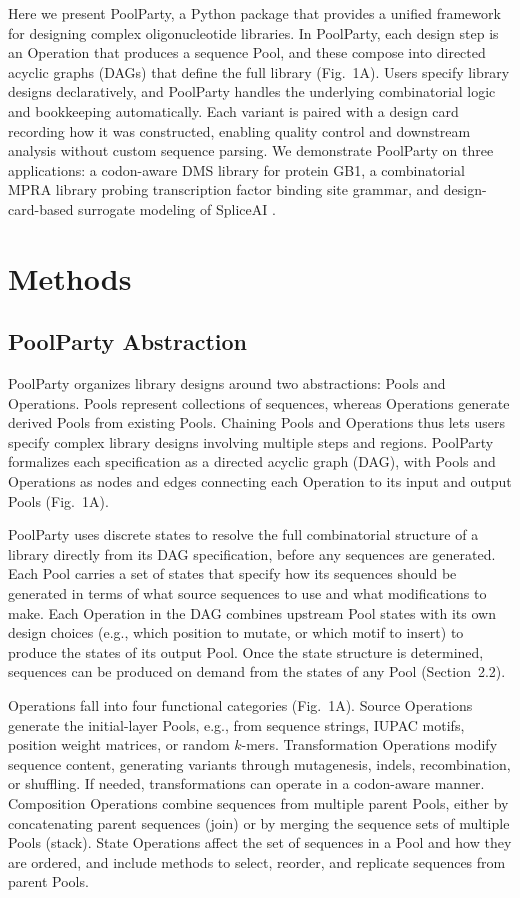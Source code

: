 \documentclass[unnumsec,webpdf,modern,large]{mam-authoring-template}%
\theoremstyle{thmstyleone}%
\theoremstyle{thmstyletwo}%
\theoremstyle{thmstylethree}%
\begin{document}
Here we present PoolParty, a Python package that provides a unified framework for designing complex oligonucleotide libraries. In PoolParty, each design step is an Operation that produces a sequence Pool, and these compose into directed acyclic graphs (DAGs) that define the full library (Fig.~1A). Users specify library designs declaratively, and PoolParty handles the underlying combinatorial logic and bookkeeping automatically. Each variant is paired with a design card recording how it was constructed, enabling quality control and downstream analysis without custom sequence parsing. We demonstrate PoolParty on three applications: a codon-aware DMS library for protein GB1, a combinatorial MPRA library probing transcription factor binding site grammar, and design-card-based surrogate modeling of SpliceAI \citep{Jaganathan2019ps}.


\section{Methods}

\subsection{PoolParty Abstraction}


PoolParty organizes library designs around two abstractions: Pools and Operations. Pools represent collections of sequences, whereas Operations generate derived Pools from existing Pools. Chaining Pools and Operations thus lets users specify complex library designs involving multiple steps and regions. PoolParty formalizes each specification as a directed acyclic graph (DAG), with Pools and Operations as nodes and edges connecting each Operation to its input and output Pools (Fig.~1A).

PoolParty uses discrete states to resolve the full combinatorial structure of a library directly from its DAG specification, before any sequences are generated. Each Pool carries a set of states that specify how its sequences should be generated in terms of what source sequences to use and what modifications to make. Each Operation in the DAG combines upstream Pool states with its own design choices (e.g., which position to mutate, or which motif to insert) to produce the states of its output Pool. Once the state structure is determined, sequences can be produced on demand from the states of any Pool (Section~2.2).

Operations fall into four functional categories (Fig.~1A). Source Operations generate the initial-layer Pools, e.g., from sequence strings, IUPAC motifs, position weight matrices, or random $k$-mers. Transformation Operations modify sequence content, generating variants through mutagenesis, indels, recombination, or shuffling. If needed, transformations can operate in a codon-aware manner. Composition Operations combine sequences from multiple parent Pools, either by concatenating parent sequences (join) or by merging the sequence sets of multiple Pools (stack). State Operations affect the set of sequences in a Pool and how they are ordered, and include methods to select, reorder, and replicate sequences from parent Pools.
\end{document}
